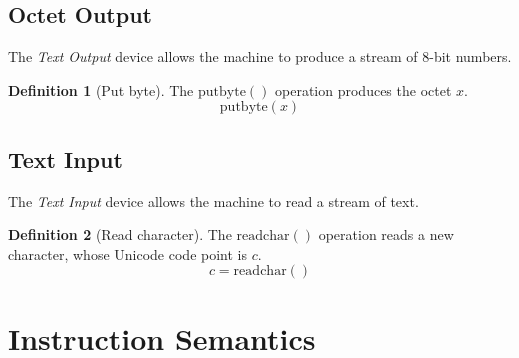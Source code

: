 \documentclass[a4paper,10pt]{article}
\newcommand{\PutByte}[1]{\mathrm{putbyte}(#1)}
\newcommand{\ReadChar}[1]{\mathrm{readchar}(#1)}
\theoremstyle{definition}
\newtheorem{definition}{Definition}
\begin{document}
\subsection{Octet Output}
\label{sec:octet-output}

The \emph{Text Output} device allows the machine to produce a stream of 8-bit numbers.

\begin{definition}[Put byte]
  The $\PutByte{}$ operation produces the octet $x$.
  \[ \PutByte{x} \]
\end{definition}

\subsection{Text Input}
\label{sec:text-input}

The \emph{Text Input} device allows the machine to read a stream of text.

\begin{definition}[Read character]
  The $\ReadChar{}$ operation reads a new character, whose Unicode code point is $c$.
  \[ c = \ReadChar{} \]
\end{definition}


\section{Instruction Semantics}
\label{sec:instruction-semantics}
\end{document}
